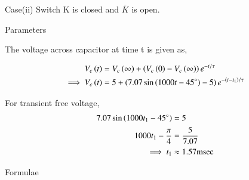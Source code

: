 \documentclass[journal,12pt,twocolumn]{IEEEtran}
\begin{document}
\newpage
Case(ii) Switch K is closed and $\overline{K}$ is open.

\begin{figure}[h!]
  \centering
  \resizebox{0.55\columnwidth}{!}{}
\end{figure}

\begin{table}[ht]
    
    \caption{Parameters}
    \label{tab:Gate.ee.54.1}
\end{table}

The voltage across capacitor at time t is given as,

\begin{align}
    V_c\left(t\right) &= V_c\left(\infty\right)+\left(V_c\left(0\right)-V_c\left(\infty\right)\right)e^{-t/ \tau}\\
    \implies V_c\left(t\right) &= 5 + \left(7.07\sin \left(1000t - 45^\circ\right)-5\right)e^{-\left(t-t_1\right)/ \tau}
\end{align}

For transient free voltage,
\begin{align}
    7.07\sin \left(1000t_1 - 45^\circ\right) &= 5\\
    1000t_1 - \frac{\pi}{4} &= \frac{5}{7.07}\\
    \implies t_1 &\approx 1.57 \text{msec}
\end{align}

\begin{table}[ht]
    
    \caption{Formulae}
    \label{tab:Gate.ee.54.2}
\end{table}
\end{document}
